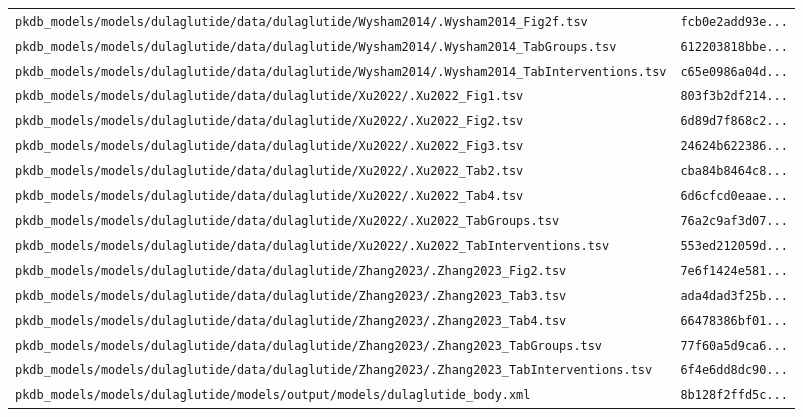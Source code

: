 \begin{longtable}{ll}
\texttt{pkdb\_models/models/dulaglutide/data/dulaglutide/Wysham2014/.Wysham2014\_Fig2f.tsv} & \texttt{fcb0e2add93e...} \\
\texttt{pkdb\_models/models/dulaglutide/data/dulaglutide/Wysham2014/.Wysham2014\_TabGroups.tsv} & \texttt{612203818bbe...} \\
\texttt{pkdb\_models/models/dulaglutide/data/dulaglutide/Wysham2014/.Wysham2014\_TabInterventions.tsv} & \texttt{c65e0986a04d...} \\
\texttt{pkdb\_models/models/dulaglutide/data/dulaglutide/Xu2022/.Xu2022\_Fig1.tsv} & \texttt{803f3b2df214...} \\
\texttt{pkdb\_models/models/dulaglutide/data/dulaglutide/Xu2022/.Xu2022\_Fig2.tsv} & \texttt{6d89d7f868c2...} \\
\texttt{pkdb\_models/models/dulaglutide/data/dulaglutide/Xu2022/.Xu2022\_Fig3.tsv} & \texttt{24624b622386...} \\
\texttt{pkdb\_models/models/dulaglutide/data/dulaglutide/Xu2022/.Xu2022\_Tab2.tsv} & \texttt{cba84b8464c8...} \\
\texttt{pkdb\_models/models/dulaglutide/data/dulaglutide/Xu2022/.Xu2022\_Tab4.tsv} & \texttt{6d6cfcd0eaae...} \\
\texttt{pkdb\_models/models/dulaglutide/data/dulaglutide/Xu2022/.Xu2022\_TabGroups.tsv} & \texttt{76a2c9af3d07...} \\
\texttt{pkdb\_models/models/dulaglutide/data/dulaglutide/Xu2022/.Xu2022\_TabInterventions.tsv} & \texttt{553ed212059d...} \\
\texttt{pkdb\_models/models/dulaglutide/data/dulaglutide/Zhang2023/.Zhang2023\_Fig2.tsv} & \texttt{7e6f1424e581...} \\
\texttt{pkdb\_models/models/dulaglutide/data/dulaglutide/Zhang2023/.Zhang2023\_Tab3.tsv} & \texttt{ada4dad3f25b...} \\
\texttt{pkdb\_models/models/dulaglutide/data/dulaglutide/Zhang2023/.Zhang2023\_Tab4.tsv} & \texttt{66478386bf01...} \\
\texttt{pkdb\_models/models/dulaglutide/data/dulaglutide/Zhang2023/.Zhang2023\_TabGroups.tsv} & \texttt{77f60a5d9ca6...} \\
\texttt{pkdb\_models/models/dulaglutide/data/dulaglutide/Zhang2023/.Zhang2023\_TabInterventions.tsv} & \texttt{6f4e6dd8dc90...} \\
\texttt{pkdb\_models/models/dulaglutide/models/output/models/dulaglutide\_body.xml} & \texttt{8b128f2ffd5c...} \\
\end{longtable}

